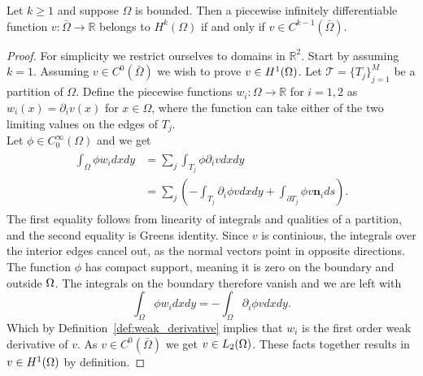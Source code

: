 
\begin{thmx}{\quad}
    Let $k\geq1$ and suppose $\Omega$ is bounded. Then a piecewise infinitely differentiable function $v:\bar{\Omega}\rightarrow \mathbb{R}$
    belongs to $H^k(\Omega)$ if and only if $v\in C^{k-1}(\bar{\Omega})$.
\end{thmx}

\begin{proof}
    For simplicity we restrict ourselves to domains in $\mathbb{R}^2$.
%
    Start by assuming $k=1$.
    Assuming $v\in C^0(\bar\Omega)$ we wish to prove $v\in H^1(\Omega)$. Let $\mathcal{T}={\{T_j\}}^M_{j=1}$ be a partition of $\Omega$.
    Define the piecewise functions $w_i:\Omega\rightarrow \mathbb{R}$ for $i=1,2$ as $w_i(x)=\partial_i v(x)$ for $x\in\Omega$,
     where the function can take either of the two limiting values on the edges of $T_j$. %
    \\
    Let $\phi\in C^{\infty}_0 (\Omega)$
   and we get
    \begin{align}
    \begin{split}
    \int_\Omega \phi w_i dxdy &= \sum_j\int_{T_j} \phi \partial_i v dx dy \\
        &= \sum_j \left( -\int_{T_j} \partial_i \phi v dxdy + \int_{\partial T_j} \phi v \mathbf{n}_i ds\right).
    \end{split}
    \end{align}
    The first equality follows from linearity of integrals and qualities of a partition, and the second equality is Greens identity.
    Since $v$ is continious, 
    the integrals over the interior edges cancel out,
    as the normal vectors point in opposite directions.
     The function $\phi$ has compact support, 
     meaning it is zero on the boundary and outside $\Omega$. 
     The integrals on the boundary therefore vanish and we are left with
    \begin{equation}
        \int_\Omega \phi w_i dxdy = -\int_\Omega \partial_i \phi v dxdy.
    \end{equation}
    Which by Definition~\ref{def:weak_derivative} implies that $w_i$ is the first order weak derivative of $v$.
    As $v\in C^0(\bar\Omega)$ we get $v \in L_2(\Omega)$. These facts together results in $v\in H^1(\Omega)$ by definition.


\end{proof}
